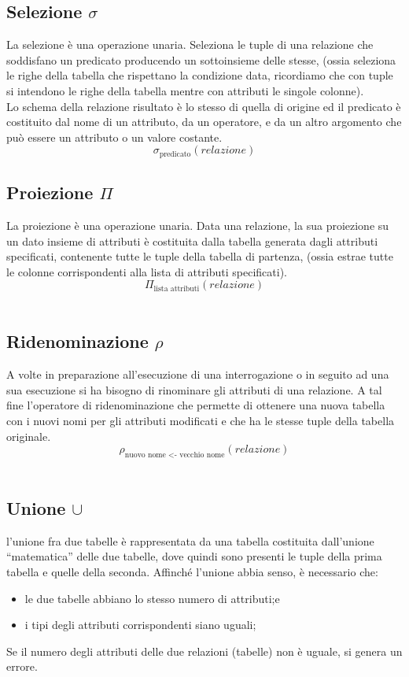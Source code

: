 \documentclass{report}
\begin{document}
\subsection{Selezione $\sigma$ }
La selezione è una operazione unaria. Seleziona le tuple di una relazione che soddisfano un predicato
producendo un sottoinsieme delle stesse, (ossia seleziona le righe della tabella che rispettano la condizione data, ricordiamo che con tuple si intendono le righe della tabella mentre con attributi le singole colonne).\\
Lo schema della relazione risultato è lo stesso di quella di origine ed il predicato è costituito dal nome di un attributo, da un operatore, e da un altro argomento che può essere un attributo o un valore
costante.\\
$$\sigma_{\text{predicato}}(relazione)$$

\subsection{Proiezione $\Pi$}
La proiezione è una operazione unaria. Data una relazione, la sua proiezione su un dato insieme di attributi è costituita dalla tabella generata dagli attributi specificati, contenente tutte le tuple della tabella di partenza, (ossia estrae tutte le colonne corrispondenti alla lista di attributi specificati).\\
$$\Pi_{\text{lista attributi}}(relazione)$$\\

\subsection{Ridenominazione $\rho$}
A volte in preparazione all’esecuzione di una interrogazione o in seguito ad una sua esecuzione si ha bisogno di rinominare gli attributi di una relazione. A tal fine l’operatore di ridenominazione che permette di ottenere una nuova tabella con i nuovi nomi per gli attributi modificati e che ha le stesse tuple della tabella originale.\\
$$\rho_{\text{nuovo nome <- vecchio nome}}(relazione)$$\\

\subsection{Unione $\cup$}
l’unione fra due tabelle è rappresentata da una tabella costituita dall’unione “matematica” delle due tabelle, dove quindi sono presenti le tuple della prima tabella e quelle della seconda. Affinché l’unione abbia senso, è necessario che:
\begin{itemize}
    \item le due tabelle abbiano lo stesso numero di attributi;e
    \item i tipi degli attributi corrispondenti siano uguali;
\end{itemize}
Se il numero degli attributi delle due relazioni (tabelle) non è uguale, si genera un errore.\\
\end{document}
